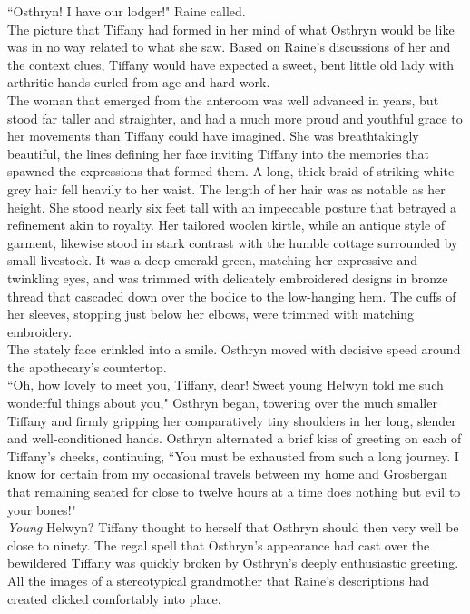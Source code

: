 ``Osthryn! I have our lodger!" Raine called.\\
The picture that Tiffany had formed in her mind of what Osthryn would be like was in no way related to what she saw.
Based on Raine's discussions of her and the context clues, Tiffany would have expected a sweet, bent little old lady with arthritic hands curled from age and hard work.\\

The woman that emerged from the anteroom was well advanced in years, but stood far taller and straighter, and had a much more proud and youthful grace to her movements than Tiffany could have imagined.
She was breathtakingly beautiful, the lines defining her face inviting Tiffany into the memories that spawned the expressions that formed them.
A long, thick braid of striking white-grey hair fell heavily to her waist. 
The length of her hair was as notable as her height. 
She stood nearly six feet tall with an impeccable posture that betrayed a refinement akin to royalty.
Her tailored woolen kirtle, while an antique style of garment, likewise stood in stark contrast with the humble cottage surrounded by small livestock.
It was a deep emerald green, matching her expressive and twinkling eyes, and was trimmed with delicately embroidered designs in bronze thread that cascaded down over the bodice to the low-hanging hem.
The cuffs of her sleeves, stopping just below her elbows, were trimmed with matching embroidery.\\

The stately face crinkled into a smile. 
Osthryn moved with decisive speed around the apothecary's countertop.\\
``Oh, how lovely to meet you, Tiffany, dear! Sweet young Helwyn told me such wonderful things about you," Osthryn began, towering over the much smaller Tiffany and firmly gripping her comparatively tiny shoulders in her long, slender and well-conditioned hands. 
Osthryn alternated a brief kiss of greeting on each of Tiffany's cheeks, continuing, ``You must be exhausted from such a long journey. I know for certain from my occasional travels between my home and Grosbergan that remaining seated for close to twelve hours at a time does nothing but evil to your bones!"\\
\textit{Young} Helwyn? Tiffany thought to herself that Osthryn should then very well be close to ninety. 
The regal spell that Osthryn's appearance had cast over the bewildered Tiffany was quickly broken by Osthryn's deeply enthusiastic greeting. 
All the images of a stereotypical grandmother that Raine's descriptions had created clicked comfortably into place.\\

